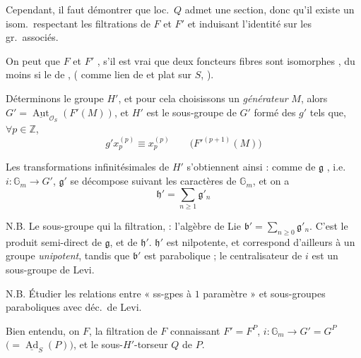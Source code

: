 \documentclass[11pt,a4paper]{article}
\begin{document}
Cependant, il faut démontrer que loc.\ $Q$ admet une section, donc qu'il
existe un isom.\ respectant les filtrations de $F$ et $F'$ et induisant
l'identité sur les gr.\ associés.

On peut \ill{} que $F$ et $F'$ , \struck{\ill{}} s'il est
vrai que deux foncteurs fibres sont isomorphes  \ill{}, du
moins  si le \ill{} de \ill{},  (\ill{} comme lien de  \ill{} et plat
sur $S$, \ill{}).

Déterminons le groupe $H'$, et pour cela choisissons un \emph{générateur} $M$,
alors $G' = \underline{\operatorname{Aut}}_{\mathcal{O}_{S}}(F'(M))$, et $H'$
est le sous-groupe de $G'$ formé des $g'$ tels que,
$\forall p \in \mathbb{Z}$,
\[
g' x_{p}^{(p)} \equiv x_{p}^{(p)} \qquad
\bigl( F'^{(p+1)}(M) \bigr)
\]

Les transformations infinitésimales de $H'$ s'obtiennent ainsi : comme \ill{}
de $\mathfrak{g}$ \ill{}, i.e.\ $i : \mathbb{G}_{m} \to G'$,
$\mathfrak{g}'$ se décompose suivant les caractères de $\mathbb{G}_{m}$, et on
a
\[
\boxed{\;\mathfrak{h}' = \sum_{n \geq 1} \mathfrak{g}'_{n}\;}
\]

N.B. Le sous-groupe qui  la filtration, \ill{} :
l'algèbre de Lie $\mathfrak{b}' = \sum_{n \geq 0} \mathfrak{g}'_{n}$. C'est le
produit semi-direct \ill{} de $\mathfrak{g}$, et de $\mathfrak{h}'$.
$\mathfrak{h}'$ est nilpotente, et correspond d'ailleurs à un groupe
\emph{unipotent}, tandis que $\mathfrak{b}'$ est parabolique ; le
centralisateur de $i$ est un sous-groupe de Levi.

N.B. Étudier les relations entre « ss-gpes à $1$ paramètre » et sous-groupes
paraboliques avec déc.\ de Levi.

Bien entendu, on  $F$,  la
filtration de $F$ connaissant $F' = F^{P}$,
$i : \mathbb{G}_{m} \to G' = G^{P}$
$\bigl( = \underline{\operatorname{Ad}}_{S}(P) \bigr)$, et le
sous-$H'$-torseur  $Q$ de $P$.
\end{document}
